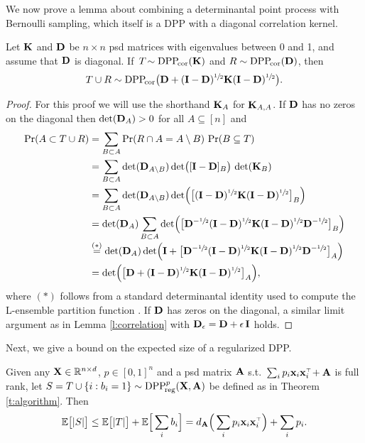 \documentclass[thesis.tex]{subfiles}
\begin{document}
We now prove a lemma about combining a determinantal point process
with Bernoulli sampling, which itself is a DPP with a diagonal correlation
kernel.
\begin{lemma}
  Let $\mathbf K$ and $\mathbf D$ be $n\times n$ psd matrices with eigenvalues between
0 and 1, and assume that $\mathbf D$ is diagonal. If\, $T\!\sim{{\mathrm{DPP}}_{\!\mathrm{cor}}}(\mathbf K)$ and
$R\sim{{\mathrm{DPP}}_{\!\mathrm{cor}}}(\mathbf D)$, then
\begin{align*}T\cup R\sim {{\mathrm{DPP}}_{\!\mathrm{cor}}}\big(\mathbf D+(\mathbf I-\mathbf D)^{\sfrac12}\mathbf K
  (\mathbf I-\mathbf D)^{\sfrac12}\big).
  \end{align*}
\end{lemma}
\begin{proof}
For this proof we will use the shorthand $\mathbf K_A$ for $\mathbf K_{A,A}$. If
$\mathbf D$ has no zeros on the diagonal then $\det(\mathbf D_A)>0$ for all
$A\subseteq[n]$ and
  \begin{align*}
    \mathrm{Pr}(A \subset T \cup R)
    &=\sum_{B\subset A}\mathrm{Pr}(R\cap A=A\setminus B) \ \mathrm{Pr}(B\subseteq T)\\
    &=\sum_{B\subset A}\det(\mathbf D_{A\setminus
      B})\det\!\big([\mathbf I-\mathbf D]_B\big)\,\det(\mathbf K_B) \\
    &=\sum_{B\subset A}\det(\mathbf D_{A\setminus
      B})\det\!\Big(\big[(\mathbf I-\mathbf D)^{\sfrac12}\mathbf K(\mathbf I-\mathbf D)^{\sfrac12}\big]_B\Big) \\
    &=\det(\mathbf D_A) \sum_{B\subset A}\det\!\Big(\big[\mathbf D^{-\sfrac12}
      (\mathbf I-\mathbf D)^{\sfrac12}\mathbf K(\mathbf I-\mathbf D)^{\sfrac12}\mathbf D^{-\sfrac12}\big]_{B}\Big)\\[-1mm]
    &\overset{(*)}{=}\det(\mathbf D_A)\det\!\Big(\mathbf I + \big[\mathbf D^{-\sfrac12}
      (\mathbf I-\mathbf D)^{\sfrac12}\mathbf K(\mathbf I-\mathbf D)^{\sfrac12}\mathbf D^{-\sfrac12}\big]_A\Big)\\
    &=\det\!\Big(\big[\mathbf D+ (\mathbf I-\mathbf D)^{\sfrac12}\mathbf K(\mathbf I-\mathbf D)^{\sfrac12}\big]_A\Big),
  \end{align*}
  where $(*)$ follows from a standard determinantal identity used to
  compute the L-ensemble partition function
  \cite[Theorem~2.1]{dpp-ml}. If $\mathbf D$ has zeros on the diagonal, a
  similar limit argument as in Lemma \ref{l:correlation} with
  $\mathbf D_\epsilon=\mathbf D+\epsilon\,\mathbf I$ holds.
\end{proof}
Next, we give a bound on the expected size of a regularized DPP.
\begin{lemma}
  Given any $\mathbf X\in\mathbb R^{n\times d}$, $p\in[0,1]^n$ and a psd matrix $\mathbf A$
  s.t.~$\sum_ip_i\x_i\x_i^\top\!+\A$ is
  full rank, let $S=T\cup \{i:b_i=1\}\sim {{\mathrm{DPP}}_{\!\mathrm{reg}}^{p}}(\mathbf X,\mathbf A)$ be defined
as in Theorem \ref{t:algorithm}. Then
\begin{align*}
\E\big[|S|\big]\leq \E\big[|T|\big] + \E\Big[\sum_i b_i\Big] =
  d_{\A}\Big(\sum_ip_i\x_i\x_i^\top\Big) + \sum_i  p_i.
\end{align*}
\end{lemma}
\end{document}
